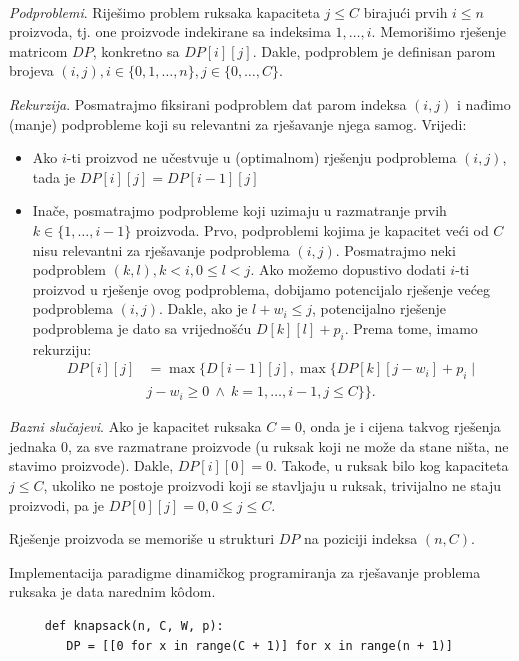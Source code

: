 \begin{solution}
	\\
	\textit{Podproblemi}. Riješimo problem ruksaka kapaciteta $j\leq C$ birajući prvih $i\leq n$ proizvoda, tj. one proizvode indekirane sa indeksima $1, \ldots , i$.  Memorišimo rješenje matricom $DP$, konkretno sa $DP[i ][j]$. Dakle, podproblem je definisan parom brojeva $(i,j), i\in \{0, 1, \ldots, n\}, j \in \{0, \ldots, C \}$. 
	
	\textit{Rekurzija}. Posmatrajmo fiksirani podproblem dat parom indeksa $(i, j)$ i nađimo  (manje) podprobleme koji su relevantni za rješavanje njega samog. Vrijedi:
	
	\begin{itemize}
		\item Ako $i$-ti proizvod ne učestvuje u (optimalnom) rješenju podproblema $(i, j)$, tada je $DP[i][j] = DP[i-1][j]  $
		\item     Inače, posmatrajmo podprobleme koji uzimaju u razmatranje prvih $k\in \{1, \ldots, i-1\}$ proizvoda. Prvo, podproblemi kojima je kapacitet veći od $C$ nisu relevantni za rješavanje podproblema $(i,j)$. Posmatrajmo neki podproblem $(k,l), k < i, 0 \leq l < j$. Ako možemo dopustivo dodati $i$-ti proizvod u rješenje ovog podproblema, dobijamo potencijalo rješenje većeg podproblema $(i,j)$. Dakle, ako je $l + w_i \leq j$, potencijalno rješenje podproblema je dato sa vrijednošću $D[k][l] + p_i$.  Prema tome, imamo rekurziju:
	   \begin{align*}
		      DP[i ][j ]& = \max\{ D[i-1][j], \max\{DP[k][j - w_i ] + p_i \mid   \\   & j - w_i \geq  0 \ \wedge\  k=1, \ldots, i-1, j \leq C\}\}.
		\end{align*}
	\end{itemize}
	
	 \textit{ Bazni slučajevi}. Ako je kapacitet ruksaka $C=0$, onda je i cijena takvog rješenja jednaka 0, za sve razmatrane proizvode (u ruksak koji ne može da stane ništa, ne  stavimo proizvode). Dakle, $DP[i][0] = 0.$ Takođe, u ruksak bilo kog kapaciteta $j \leq C$, ukoliko ne postoje proizvodi koji se stavljaju u ruksak, trivijalno ne staju proizvodi, pa je $DP[0][j] = 0, 0 \leq j \leq C$.
	 
	 Rješenje proizvoda se memoriše u strukturi $DP$ na poziciji indeksa $(n, C)$.
	 
	 Implementacija paradigme dinamičkog programiranja za rješavanje problema ruksaka je data narednim k\^odom.
	 
	 \begin{verbatim}
	 def knapsack(n, C, W, p):
	 	DP = [[0 for x in range(C + 1)] for x in range(n + 1)]
	 

\end{verbatim}
\end{solution}

